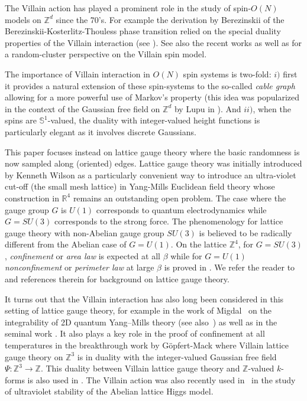 \documentclass[11pt]{preprint}
\def\R{\mathbb{R}}
\def\Z{\mathbb{Z}}
\begin{document}
The Villain action has played a prominent role in the study of spin-$O(N)$ models on $\Z^d$ since the 70's. For example the derivation by Berezinskii of the Berezinskii-Kosterlitz-Thouless phase transition relied on the special duality properties of the Villain interaction (see \cite{berezinskii1971destruction, jose1977renormalization}).  See also the recent works \cite{AHPS21, lammers2023bijecting, garban2023quantitative} as well as \cite{dubedat2022random} for a random-cluster perspective on the Villain spin model. 

The importance of Villain interaction in $O(N)$ spin systems is two-fold: $i)$ first it provides a natural extension of these spin-systems to the so-called {\em cable graph} allowing for a more powerful use of Markov's property (this idea was popularized in the context of the Gaussian free field on $\Z^d$ by Lupu in \cite{lupu2016loop}).  And $ii)$, when the spins are $\mathbb{S}^1$-valued, the duality with integer-valued height functions is particularly elegant as it involves discrete Gaussians. 

This paper focuses instead on lattice gauge theory where the basic randomness is now sampled along (oriented) edges.  
Lattice gauge theory was initially introduced by Kenneth Wilson as a particularly convenient way to introduce an ultra-violet cut-off
(the small mesh lattice)
in Yang-Mills Euclidean field theory whose construction in $\R^4$ remains an outstanding open problem. The case 
where the gauge group  $G$ is $U(1)$ corresponds to quantum electrodynamics while $G=SU(3)$ corresponds to 
the strong force. The phenomenology for lattice gauge theory with non-Abelian gauge group $SU(3)$  is 
believed to be radically different  from the Abelian case of $G=U(1)$. On the lattice $\Z^4$, for $G=SU(3)$, 
{\em confinement} or {\em area law} is expected at all $\beta$ while for $G=U(1)$  {\em nonconfinement} or 
{\em perimeter law} at large $\beta$ is proved in \cite{guth1980existence,frohlich1982massless}. 
We refer the reader to \cite{seiler1982gauge, frohlich1982massless, chatterjee2019yang,chatterjee2020wilson,garban2023improved,forsstrom2023wilson,cao2023random} and references therein for background on lattice gauge theory.

 It turns out that the Villain interaction has also long been considered in this setting of lattice gauge theory, for example
in the work of Migdal~\cite{Migdal75} on the integrability of 2D quantum Yang--Mills theory (see also~\cite{Driver89,Witten91,Levy03})
as well as in
 the seminal work \cite{frohlich1982massless}. It also plays a key role in the proof of confinement at all temperatures in the breakthrough work by G\"opfert-Mack \cite{gopfert1982proof} where Villain lattice gauge theory on $\Z^3$ is in duality with the integer-valued Gaussian free field $\Psi \colon \Z^3 \to \Z$. This duality between Villain lattice gauge theory and $\Z$-valued $k$-forms is also used in \cite{garban2023improved}.
 The Villain action was also recently used in~\cite{CC22} in the study of ultraviolet stability of the Abelian lattice Higgs model. 
\end{document}

